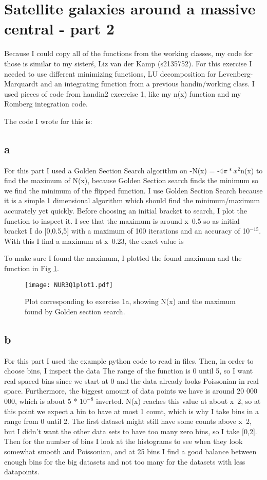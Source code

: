 \section{Satellite galaxies around a massive central - part 2}

Because I could copy all of the functions from the working classes, 
my code for those is similar to my sister\'s, Liz van der Kamp (s2135752). 
For this exercise I needed to use different minimizing functions, LU decomposition for Levenberg-Marquardt
and an integrating function from a previous handin/working class.
I used pieces of code from handin2 excercise 1, like my n(x) function and my Romberg integration code.

The code I wrote for this is:


\subsection*{a}

For this part I used a Golden Section Search algorithm on -N(x) = -$4\pi *x^2$n(x) to find the maximum of N(x),
because Golden Section search finds the minimum so we find the minimum of the flipped function. I use Golden Section
Search because it is a simple 1 dimensional algorithm which should find the minimum/maximum accurately yet quickly.
Before choosing an initial bracket to search, I plot the function to inspect it. I see that the maximum is around 
x~0.5 so as initial bracket I do [0,0.5,5] with a maximum of 100 iterations and an accuracy of 10$^{-15}$. 
With this I find a maximum at x~0.23, the exact value is


To make sure I found the maximum, I plotted the found maximum and the function in Fig \ref{fig:fig1}.
\begin{figure}[h!]
  \centering
  \texttt{[image: NUR3Q1plot1.pdf]}
  \caption{Plot corresponding to exercise 1a, showing  N(x) and the maximum found by Golden section search.}
  \label{fig:fig1}
\end{figure} 


\subsection*{b}

For this part I used the example python code to read in files. Then, in order to choose bins, I inspect the data
The range of the function is 0 until 5, so I want real spaced bins since we start at 0 and the data already looks
Poissonian in real space. Furthermore, the biggest amount of data points we have is around 20 000 000, which is about 
5 * $10^{-8}$ inverted. N(x) reaches this value at about x~2, so at this point we expect a bin to have at most 1 count,
which is why I take bins in a range from 0 until 2. The first dataset might still have some counts above x~2, but
I didn't want the other data sets to have too many zero bins, so I take [0,2].
Then for the number of bins I look at the histograms to see when they look somewhat smooth and Poissonian, and at 
25 bins I find a good balance between enough bins for the big datasets and not too many for the datasets with less
datapoints.


